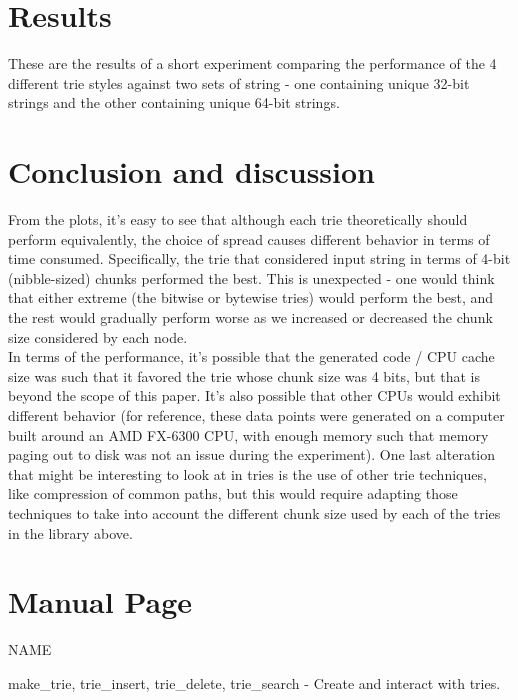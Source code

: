 \documentclass{llncs}
\begin{document}
\section{Results}
These are the results of a short experiment comparing the performance of the 4 different trie styles against two sets of string - one containing unique 32-bit strings and the other containing unique 64-bit strings.

\newpage
\section{Conclusion and discussion}
From the plots, it's easy to see that although each trie theoretically should perform equivalently, the choice of spread causes different behavior in terms of time consumed. Specifically, the trie that considered input string in terms of 4-bit (nibble-sized) chunks performed the best. This is unexpected - one would think that either extreme (the bitwise or bytewise tries) would perform the best, and the rest would gradually perform worse as we increased or decreased the chunk size considered by each node.\\
In terms of the performance, it's possible that the generated code / CPU cache size was such that it favored the trie whose chunk size was 4 bits, but that is beyond the scope of this paper. It's also possible that other CPUs would exhibit different behavior (for reference, these data points were generated on a computer built around an AMD FX-6300 CPU, with enough memory such that memory paging out to disk was not an issue during the experiment).
One last alteration that might be interesting to look at in tries is the use of other trie techniques, like compression of common paths, but this would require adapting those techniques to take into account the different chunk size used by each of the tries in the library above.
\newpage

\section{Manual Page}
\noindent NAME

make\_trie, trie\_insert, trie\_delete, trie\_search - Create and interact with tries.\\
\end{document}
